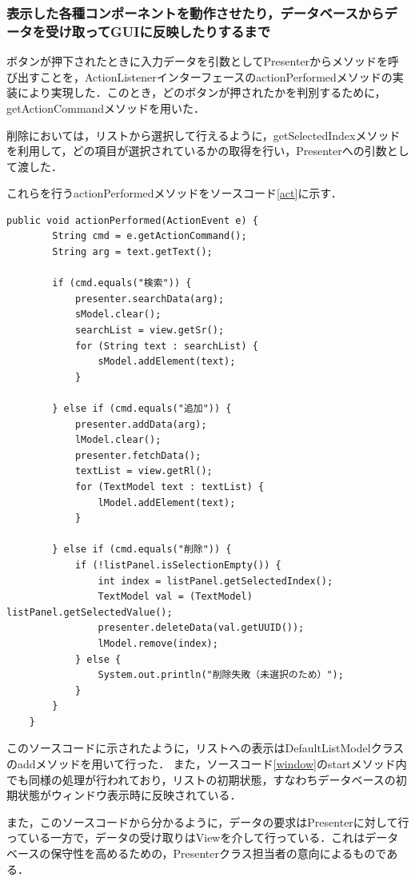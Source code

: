 \documentclass[12pt]{jarticle}
\begin{document}
\subsubsection{表示した各種コンポーネントを動作させたり，データベースからデータを受け取ってGUIに反映したりするまで}
ボタンが押下されたときに入力データを引数としてPresenterからメソッドを呼び出すことを，ActionListenerインターフェースのactionPerformedメソッドの実装により実現した．このとき，どのボタンが押されたかを判別するために，getActionCommandメソッドを用いた．

削除においては，リストから選択して行えるように，getSelectedIndexメソッドを利用して，どの項目が選択されているかの取得を行い，Presenterへの引数として渡した．

これらを行うactionPerformedメソッドをソースコード\ref{act}に示す．

\begin{lstlisting}[caption=actionPerformedメソッド, label=act]
    public void actionPerformed(ActionEvent e) {
        String cmd = e.getActionCommand();
        String arg = text.getText();

        if (cmd.equals("検索")) {
            presenter.searchData(arg);
            sModel.clear();
            searchList = view.getSr();
            for (String text : searchList) {
                sModel.addElement(text);
            }

        } else if (cmd.equals("追加")) {
            presenter.addData(arg);
            lModel.clear();
            presenter.fetchData();
            textList = view.getRl();
            for (TextModel text : textList) {
                lModel.addElement(text);
            }

        } else if (cmd.equals("削除")) {
            if (!listPanel.isSelectionEmpty()) {
                int index = listPanel.getSelectedIndex();
                TextModel val = (TextModel) listPanel.getSelectedValue();
                presenter.deleteData(val.getUUID());
                lModel.remove(index);
            } else {
                System.out.println("削除失敗（未選択のため）");
            }
        }
    }
\end{lstlisting}

このソースコードに示されたように，リストへの表示はDefaultListModelクラスのaddメソッドを用いて行った．
また，ソースコード\ref{window}のstartメソッド内でも同様の処理が行われており，リストの初期状態，すなわちデータベースの初期状態がウィンドウ表示時に反映されている．

また，このソースコードから分かるように，データの要求はPresenterに対して行っている一方で，データの受け取りはViewを介して行っている．これはデータベースの保守性を高めるための，Presenterクラス担当者の意向によるものである． \\
\end{document}
